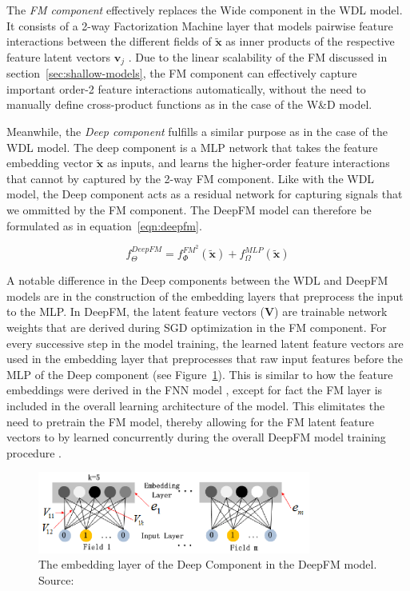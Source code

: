 \documentclass{mldsmsc}
\begin{document}
The \emph{FM component} effectively replaces the Wide component in the WDL model. It consists
of a 2-way Factorization Machine layer that models pairwise feature interactions between the
different fields of $\tilde{\mathbf{x}}$ as inner products of the respective feature latent
vectors $\mathbf{v}_j$ \citep{RefWorks:guo2017deepfm:}. Due to the linear scalability of
the FM discussed in section~\ref{sec:shallow-models}, the FM component can effectively
capture important order-2 feature interactions automatically, without the need to manually
define cross-product functions as in the case of the W\&D model.

Meanwhile, the \emph{Deep component} fulfills a similar purpose as in the case of the WDL
model. The deep component is a MLP network that takes the feature embedding vector $\tilde{\mathbf{x}}$
as inputs, and learns the higher-order feature interactions that cannot by captured by the
2-way FM component. Like with the WDL model, the Deep component acts as a residual network
for capturing signals that we ommitted by the FM component. The DeepFM model can therefore
be formulated as in equation~\ref{eqn:deepfm}.

\begin{equation}\label{eqn:deepfm}
    f_{\Theta}^{DeepFM} = f_{\Phi}^{FM^2}(\tilde{\mathbf{x}}) + f_{\Omega}^{MLP}(\tilde{\mathbf{x}})
\end{equation}

A notable difference
in the Deep components between the WDL and DeepFM models are in the construction of the
embedding layers that preprocess the input to the MLP. In DeepFM, the latent feature vectors
($\mathbf{V}$) are trainable network weights that are derived during SGD optimization in the FM
component. For every successive step in the model training, the learned latent feature vectors
are used in the embedding layer that preprocesses that raw input features before the MLP of 
the Deep component (see Figure~\ref{fig:deepfm-embedding}). This is similar to how the feature embeddings were derived in the FNN model
\citep{RefWorks:zhang2016deep}, except for fact the FM layer is included in the overall learning
architecture of the model. This elimitates the need to pretrain the FM model, thereby allowing
for the FM latent feature vectors to by learned concurrently during the overall DeepFM model
training procedure \citep{RefWorks:guo2017deepfm:}.

\begin{figure}[h]
    \centering
    \includegraphics[width=0.8\textwidth]{../figures/deepfm_embedding.png}
    \caption{The embedding layer of the Deep Component in the DeepFM model. Source: \citep{RefWorks:guo2017deepfm:}}
    \label{fig:deepfm-embedding}
\end{figure}
\end{document}
